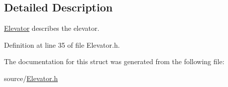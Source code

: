 \subsection{Detailed Description}
{\ttfamily \hyperlink{structElevator}{Elevator}} describes the elevator. 

Definition at line 35 of file Elevator.\+h.



The documentation for this struct was generated from the following file\+:\begin{DoxyCompactItemize}
\item 
source/\hyperlink{Elevator_8h}{Elevator.\+h}\end{DoxyCompactItemize}
